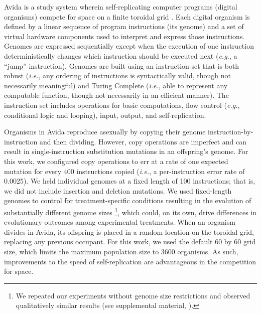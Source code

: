 Avida is a study system wherein self-replicating computer programs (digital organisms) compete for space on a finite toroidal grid \citep{ofria_avida:_2009}.
Each digital organism is defined by a linear sequence of program instructions (its genome) and a set of virtual hardware components used to interpret and express those instructions. 
Genomes are expressed sequentially except when the execution of one instruction deterministically changes which instruction should be executed next (\textit{e.g.}, a ``jump'' instruction). 
Genomes are built using an instruction set that is both robust (\textit{i.e.}, any ordering of instructions is syntactically valid, though not necessarily meaningful) and Turing Complete (\textit{i.e.}, able to represent any computable function, though not necessarily in an efficient manner).
The instruction set includes operations for basic computations, flow control (\textit{e.g.}, conditional logic and looping), input, output, and self-replication.

Organisms in Avida reproduce asexually by copying their genome instruction-by-instruction and then dividing. 
However, copy operations are imperfect and can result in single-instruction substitution mutations in an offspring's genome. 
For this work, we configured copy operations to err at a rate of one expected mutation for every 400 instructions copied (\textit{i.e.}, a per-instruction error rate of 0.0025).
We held individual genomes at a fixed length of 100 instructions; that is, we did not include insertion and deletion mutations. 
We used fixed-length genomes to control for treatment-specific conditions resulting in the evolution of substantially different genome sizes \citep{supplemental_material}\footnote{
We repeated our experiments without genome size restrictions and observed qualitatively similar results (see supplemental material, \citealt{supplemental_material}).
}, which could, on its own, drive differences in evolutionary outcomes among experimental treatments.
When an organism divides in Avida, its offspring is placed in a random location on the toroidal grid, replacing any previous occupant.
For this work, we used the default 60 by 60 grid size, which limits the maximum population size to 3600 organisms.
As such, improvements to the speed of self-replication are advantageous in the competition for space.

